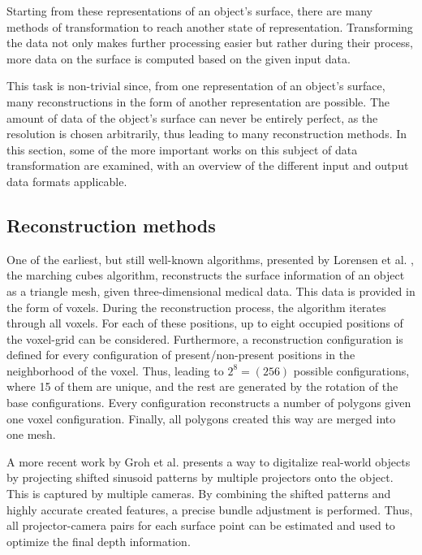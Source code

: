   Starting from these representations of an object's surface, there are many methods 
  of transformation to reach another state of representation. 
  Transforming the data not only makes further processing easier
  but rather during their process, more data on the surface is 
  computed based on the given input data.

  This task is non-trivial since, from one representation of an object's
  surface, many reconstructions in the form of another representation 
  are possible. The amount of data of the object's surface can never
  be entirely perfect, as the resolution is chosen arbitrarily, thus leading to many reconstruction methods.
  In this section, some of the more important works on this subject of data transformation are examined, with 
  an overview of the different input and output data formats applicable. 

 \subsection{Reconstruction methods}

  One of the earliest, but still well-known algorithms, presented by
  Lorensen et al. \cite{Lorensen:1987:MCH:37402.37422}, the marching cubes algorithm, reconstructs the surface information of an object as a
  triangle mesh, given three-dimensional medical data. This data is provided in the form of
  voxels. 
  During the reconstruction process, the algorithm iterates through all voxels. For each of these positions, up to eight occupied positions of the voxel-grid can be considered. Furthermore, a reconstruction configuration is defined for every configuration of present/non-present positions in the neighborhood of the voxel. Thus, leading to $2^8 = (256)$ possible configurations, where 15 of them are unique, and the rest are generated by the rotation of the base configurations.  Every configuration reconstructs a number of polygons given one voxel configuration. Finally, all polygons created this way are merged into one mesh.

  A more recent work by Groh et al.\cite{Groh2017} presents a way to digitalize real-world objects by projecting shifted sinusoid patterns by multiple projectors onto the object. This is captured by multiple cameras. By combining the shifted patterns and highly accurate created features, a precise bundle adjustment is performed. Thus, all projector-camera pairs for each surface point can be estimated and used to optimize the final depth information.

